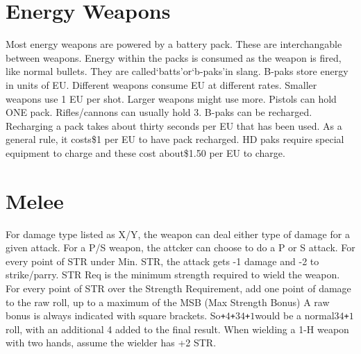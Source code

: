 \documentclass[twoside]{book}
\begin{document}
\begin{multicols}{2}
    


\hspace{-2ex}
\vspace{1ex}


    


\hspace{-2ex}
\vspace{1ex}


    
\end{multicols}
  
    

\section{Energy Weapons}
    
    {  
    Most energy weapons are powered by a battery pack. These are interchangable between weapons. Energy within the packs is consumed as the weapon is fired, like normal bullets. They are called`batts'or`b-paks'in slang. B-paks store energy in units of EU. Different weapons consume EU at different rates. Smaller weapons use 1 EU per shot. Larger weapons might use more. Pistols can hold ONE pack. Rifles/cannons can usually hold 3. B-paks can be recharged. Recharging a pack takes about thirty seconds per EU that has been used. As a general rule, it costs\$1 per EU to have pack recharged. HD paks require special equipment to charge and these cost about\$1.50 per EU to charge.
    }
  
    

\section{Melee}
    
    {  
    For damage type listed as X/Y, the weapon can deal either type of damage for a given attack. For a P/S weapon, the attcker can choose to do a P or S attack. For every point of STR under Min. STR, the attack gets -1 damage and -2 to strike/parry. STR Req is the minimum strength required to wield the weapon. For every point of STR over the Strength Requirement, add one point of damage to the raw roll, up to a maximum of the MSB (Max Strength Bonus) A raw bonus is always indicated with square brackets. So\texttt{+}\ensuremath{4}\texttt{+}\ensuremath{3}\ensuremath{4}\texttt{+}\ensuremath{1}\textscbf{}would be a normal\ensuremath{3}\ensuremath{4}\texttt{+}\ensuremath{1}roll, with an additional 4 added to the final result. When wielding a 1-H weapon with two hands, assume the wielder has +2 STR.
    }
  
\end{document}
